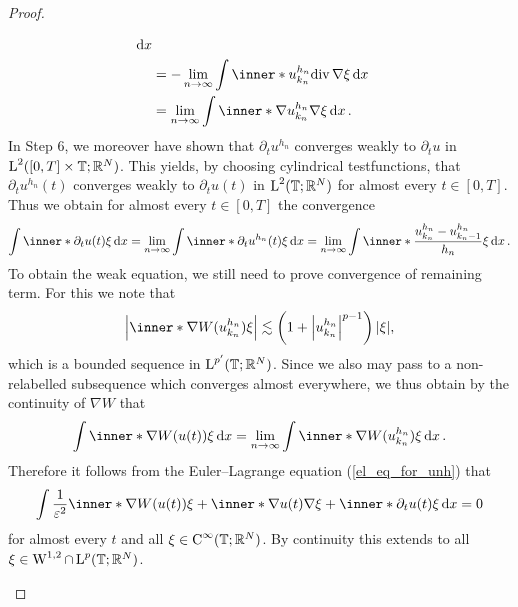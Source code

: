 \begin{proof}
\begin{description}[wide=0pt]
\begin{align*}
			\dd{ x }
			\\
			& = 
			-
			\lim_{ n \to \infty }
			\int
			\inner*{ u_{ k_{ n } }^{ h_{ n } } }{ \divg \nabla \xi  }
			\dd{x }
			\\
			& = 
			\lim_{ n \to \infty }
			\int
			\inner*{ \nabla u_{ k_{ n } }^{ h_{ n } } }{ \nabla \xi }
			\dd{ x }.
		\end{align*}
		In Step 6, we moreover have shown that $ \partial_{ t } u^{ h_{ n } } $ 
		converges weakly to $ \partial_{t } u $ in $ \operatorname{L}^{ 2 } ( [ 0, T ] 
		\times \operatorname{\mathbb{T}} ; \mathbb{ R }^{ N } ) $. This yields, by choosing 
		cylindrical testfunctions, that $ \partial_{ t } u^{ h_{ n } } ( t ) $ 
		converges weakly to $ \partial_{ t } u ( t ) $ in $ \operatorname{L}^{ 2 } ( 
		\operatorname{\mathbb{T}} ; \mathbb{ R }^{ N } ) $ for almost every $ t \in [ 0 , T ] 
		$.
		Thus we obtain for almost every $ t\in [ 0 , T ] $ the convergence
		\begin{equation*}
			\int
			\inner*{ \partial_{ t } u ( t ) }{ \xi }
			\dd{ x }
			=
			\lim_{ n \to \infty }
			\int
			\inner*{ \partial_{ t } u^{ h_{ n } } ( t ) }{ \xi }
			\dd{ x }
			=
			\lim_{ n \to \infty }
			\int
			\inner*{ \frac{ u_{ k_{ n } }^{ h_{ n } } - u_{ k_{ n } - 1 }^{ h_{ n } } }{ h_{ n } } }{ \xi }
			\dd{ x }.
		\end{equation*}
		To obtain the weak equation, we still need to prove convergence of remaining term. For this we note that 
		\begin{equation*}
			\abs{ \inner*{ \nabla W ( u_{ k_{ n } }^{ h_{ n } } ) }{ \xi } }
			\lesssim
			\left( 1 + \abs{ u_{  k_{ n } }^{ h_{ n } } }^{ p - 1 } \right) \abs{ \xi },
		\end{equation*}
		which is a bounded sequence in $ \operatorname{L}^{ p'} ( \operatorname{\mathbb{T}} ; \mathbb{ R 
		}^{ N } ) $. Since we also may pass to a non-relabelled subsequence 
		which converges almost everywhere, we thus obtain by the continuity of 
		$ \nabla W $ that
		\begin{equation*}
			\int
			\inner*{ \nabla W ( u ( t ) ) }{ \xi } 
			\dd{ x }
			=
			\lim_{ n \to \infty }
			\int
			\inner*{ \nabla W ( u_{ k_{ n } }^{ h_{ n } } ) }{ \xi }
			\dd{ x }.
		\end{equation*}
		Therefore it follows from the Euler--Lagrange equation (\ref{el_eq_for_unh}) that
		\begin{equation*}
			\int
			\frac{ 1 }{ \varepsilon^{ 2 } }
			\inner*{ \nabla W ( u ( t )) }{ \xi }
			+
			\inner*{ \nabla u( t ) }{ \nabla \xi }
			+
			\inner*{ \partial_{ t } u ( t ) }{ \xi }
			\dd{ x }
			=
			0
		\end{equation*}
		for almost every $ t $ and all $ \xi \in \operatorname{C}^{ \infty } ( \operatorname{\mathbb{T}} 
		; \mathbb{ R }^{ N } ) $. By continuity this extends to all $ \xi \in 
		\operatorname{W}^{ 1 , 2 } \cap \operatorname{L}^{ p } ( \mathbb{ T } ; \mathbb{ R }^{ N } ) $.
		

\end{description}
\end{proof}
